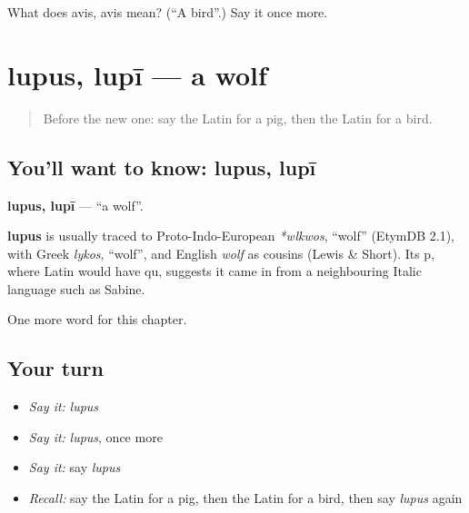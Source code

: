 \begin{tcolorbox}[breakable,colback=teal!4,colframe=teal!35!black,title={Before you move on}]
What does avis, avis mean? (\textquotedblleft{}A bird\textquotedblright{}.) Say it once more.
\end{tcolorbox}
\section[lupus, lupī]{lupus, lupī — a wolf}

\label{lesson:LA-C91-lupus}



\begin{quote}
Before the new one: say the Latin for a pig, then the Latin for a bird.
\end{quote}

\subsection*{You'll want to know: lupus, lupī}
\textbf{lupus, lupī} — \textquotedblleft{}a wolf\textquotedblright{}.

\begin{cousinweb}
\textbf{lupus} is usually traced to Proto-Indo-European \emph{*wlkwos}, \textquotedblleft{}wolf\textquotedblright{} (EtymDB 2.1), with Greek \emph{lykos}, \textquotedblleft{}wolf\textquotedblright{}, and English \emph{wolf} as cousins (Lewis \& Short). Its p, where Latin would have qu, suggests it came in from a neighbouring Italic language such as Sabine.
\end{cousinweb}

\begin{grammarlens}[title={What you've built}]
One more word for this chapter.
\end{grammarlens}

\subsection*{Your turn}
\begin{itemize}
\raggedright
  \item \emph{Say it:} \emph{lupus}
  \item \emph{Say it:} \emph{lupus}, once more
  \item \emph{Say it:} say \emph{lupus}
  \item \emph{Recall:} say the Latin for a pig, then the Latin for a bird, then say \emph{lupus} again
\end{itemize}

